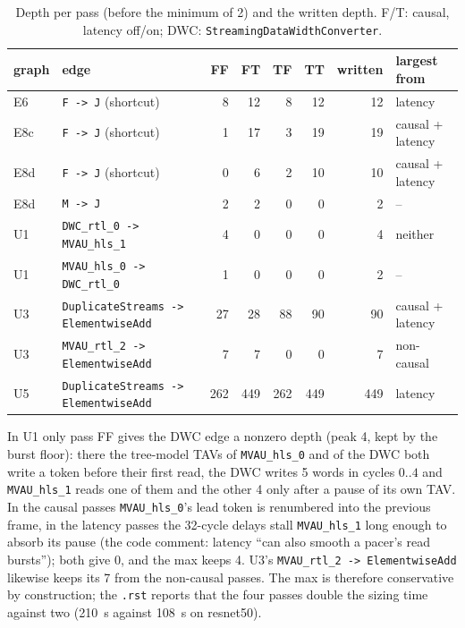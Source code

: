 \documentclass[10pt,a4paper]{article}
\newcommand{\code}[1]{\texttt{#1}}
\begin{document}
\begin{table}[h]
\centering\small
\caption{Depth per pass (before the minimum of 2) and the written depth. F/T: causal, latency off/on;
DWC: \code{StreamingDataWidthConverter}.}\label{tab:passes}
\begin{tabular}{@{}llrrrrrl@{}}
\toprule
graph & edge & FF & FT & TF & TT & written & largest from\\
\midrule
E6 & \code{F -> J} (shortcut) & 8 & 12 & 8 & 12 & 12 & latency\\
E8c & \code{F -> J} (shortcut) & 1 & 17 & 3 & 19 & 19 & causal + latency\\
E8d & \code{F -> J} (shortcut) & 0 & 6 & 2 & 10 & 10 & causal + latency\\
E8d & \code{M -> J} & 2 & 2 & 0 & 0 & 2 & --\\
U1 & \code{DWC\_rtl\_0 -> MVAU\_hls\_1} & 4 & 0 & 0 & 0 & 4 & neither\\
U1 & \code{MVAU\_hls\_0 -> DWC\_rtl\_0} & 1 & 0 & 0 & 0 & 2 & --\\
U3 & \code{DuplicateStreams -> ElementwiseAdd} & 27 & 28 & 88 & 90 & 90 & causal + latency\\
U3 & \code{MVAU\_rtl\_2 -> ElementwiseAdd} & 7 & 7 & 0 & 0 & 7 & non-causal\\
U5 & \code{DuplicateStreams -> ElementwiseAdd} & 262 & 449 & 262 & 449 & 449 & latency\\
\bottomrule
\end{tabular}
\end{table}

In U1 only pass FF gives the DWC edge a nonzero depth (peak 4, kept by the burst
floor): there the tree-model TAVs of \code{MVAU\_hls\_0} and of the DWC both write a
token before their first read, the DWC writes 5 words in cycles $0..4$ and
\code{MVAU\_hls\_1} reads one of them and the other 4 only after a pause of its own
TAV. In the causal passes \code{MVAU\_hls\_0}'s lead token is renumbered into the
previous frame, in the latency passes the 32-cycle delays stall \code{MVAU\_hls\_1}
long enough to absorb its pause (the code comment: latency ``can also smooth a pacer's
read bursts''); both give 0, and the max keeps 4. U3's
\code{MVAU\_rtl\_2 -> ElementwiseAdd} likewise keeps its 7 from the non-causal passes.
The max is therefore conservative by construction; the \code{.rst} reports that the
four passes double the sizing time against two (210~s against 108~s on resnet50).

\end{document}

